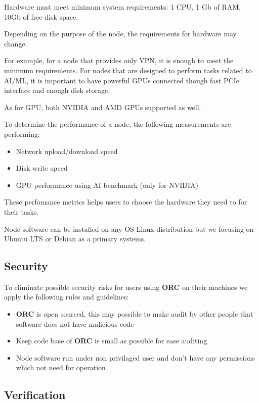 Hardware must meet minimum system requirements: 1 CPU, 1 Gb of RAM, 10Gb of free disk space.

Depending on the purpose of the node, the requirements for hardware may change.

For example, for a node that provides only VPN, it is enough to meet the minimum requirements.
For nodes that are designed to perform tasks related to AI/ML, it is important to have powerful GPUs connected though fast PCIe interface and enough disk storage.

As for GPU, both NVIDIA and AMD GPUs supported as well.

To determine the performance of a node, the following measurements are performing:

\begin{itemize}
    \item Network upload/download speed
    \item Disk write speed
    \item GPU performance using AI benchmark (only for NVIDIA)
\end{itemize}

These perfomance metrics helps users to choose the hardware they need to for their tasks.

Node software can be installed on any OS Linux distribution but we focusing on Ubuntu LTS or Debian as a primary systems.

\subsection{Security}

To eliminate possible security risks for users using \textbf{ORC} on their machines we apply the following rules and guidelines:

\begin{itemize}
    \item \textbf{ORC} is open sourced, this may possible to make audit by other people that software does not have malicious code
    \item Keep code base of \textbf{ORC} is small as possible for ease auditing
    \item Node software run under non privilaged user and don't have any permissions which not need for operation
\end{itemize}

\subsection{Verification}

